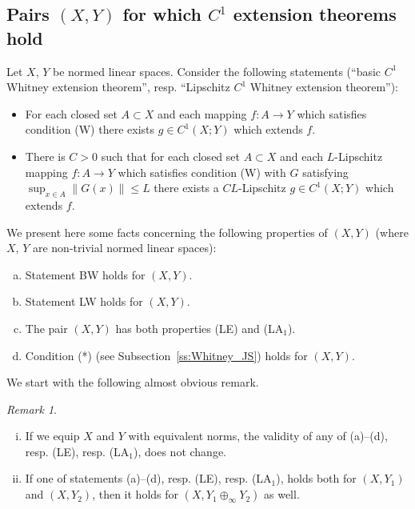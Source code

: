 \documentclass[a4paper,twoside,10pt,reqno,draft]{amsart}
\theoremstyle{definition}
\theoremstyle{remark}
\newtheorem{remark}[theorem]{Remark}
\newcommand\norm[1]{\mathopen\|#1\mathclose\|}
\newcommand\pLA[1]{(LA$_#1$)}
\newcommand\pLE{(LE)}
\newcommand\cW{(W)}
\begin{document}
\subsection{\texorpdfstring{Pairs $(X,Y)$ for which $C^1$ extension theorems hold}{Pairs (X,Y) for which C1 extension theorems hold}}\label{ss:Whitney_pairs}

Let $X$, $Y$ be normed linear spaces.
Consider the following statements (``basic $C^1$ Whitney extension theorem'', resp. ``Lipschitz $C^1$ Whitney extension theorem''):
\begin{itemize}
\item[BW:\ ]
For each closed set $A\subset X$ and each mapping $f\colon A\to Y$ which satisfies condition {\cW} there exists $g\in C^1(X;Y)$ which extends $f$.
\item[LW:\ ]
There is $C>0$ such that for each closed set $A\subset X$ and each $L$-Lipschitz mapping $f\colon A\to Y$ which satisfies condition {\cW} with $G$ satisfying $\sup_{x\in A}\norm{G(x)}\le L$
there exists a $CL$-Lipschitz $g\in C^1(X;Y)$ which extends $f$.
\end{itemize}

We present here some facts concerning the following properties of $(X,Y)$ (where $X$, $Y$ are non-trivial normed linear spaces):
\begin{enumerate}[(a)]
\item Statement BW holds for $(X,Y)$.
\item Statement LW holds for $(X,Y)$.
\item The pair $(X,Y)$ has both properties {\pLE} and \pLA1.
\item Condition (*) (see Subsection~\ref{ss:Whitney_JS}) holds for $(X,Y)$.
\end{enumerate}

We start with the following almost obvious remark.

\begin{remark}\label{r:prop_stab}
\hfill
\begin{enumerate}[(i)]
\item If we equip $X$ and $Y$ with equivalent norms, the validity of any of (a)--(d), resp. {\pLE}, resp. \pLA1, does not change.
\item If one of statements (a)--(d), resp. {\pLE}, resp. \pLA1, holds both for $(X,Y_1)$ and $(X,Y_2)$, then it holds for $(X,Y_1\oplus_\infty Y_2)$ as well.
\end{enumerate}
\end{remark}
\end{document}
